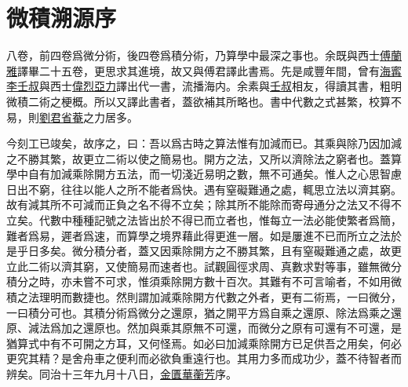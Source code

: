 \chapter {微積溯源序}

  八卷，前四卷爲微分術，後四卷爲積分術，乃算學中最深之事也。余既與西士\uline{傅蘭雅}譯畢二十五卷，更思求其進境，故又與傅君譯此書焉。先是咸豐年間，曾有\uline{海寗}\uline{李壬叔}與西士\uline{偉烈亞力}譯出代一書，流播海内。余素與\uline{壬叔}相友，得讀其書，粗明微積二術之梗概。所以又譯此書者，蓋欲補其所略也。書中代數之式甚繁，校算不易，則\uline{劉君省菴}之力居多。

  今刻工已竣矣，故序之，曰：吾以爲古時之算法惟有加減而已。其乘與除乃因加減之不勝其繁，故更立二術以使之簡易也。開方之法，又所以濟除法之窮者也。蓋算學中自有加減乘除開方五法，而一切淺近易明之數，無不可通矣。惟人之心思智慮日出不窮，往往以能人之所不能者爲快。遇有窒礙難通之處，輒思立法以濟其窮。故有減其所不可減而正負之名不得不立矣；除其所不能除而寄母通分之法又不得不立矣。代數中種種記號之法皆出於不得已而立者也，惟每立一法必能使繁者爲簡，難者爲易，遲者爲速，而算學之境界藉此得更進一層。如是屢進不已而所立之法於是乎日多矣。微分積分者，蓋又因乘除開方之不勝其繁，且有窒礙難通之處，故更立此二術以濟其窮，又使簡易而速者也。試觀圓徑求周、真數求對等事，雖無微分積分之時，亦未嘗不可求，惟須乘除開方數十百次。其難有不可言喻者，不如用微積之法理明而數捷也。然則謂加減乘除開方代數之外者，更有二術焉，一曰微分，一曰積分可也。其積分術爲微分之還原，猶之開平方爲自乘之還原、除法爲乘之還原、減法爲加之還原也。然加與乘其原無不可還，而微分之原有可還有不可還，是猶算式中有不可開之方耳，又何怪焉。如必曰加減乘除開方已足供吾之用矣，何必更究其精？是舍舟車之便利而必欲負重遠行也。其用力多而成功少，蓋不待智者而辨矣。同治十三年九月十八日，\uline{金匱}\uline{華蘅芳}序。